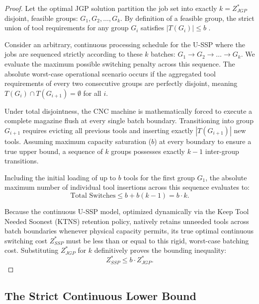 \documentclass[11pt, a4paper]{book}
\begin{document}
	\begin{proof}
		Let the optimal JGP solution partition the job set into exactly $k = Z_{JGP}^*$ disjoint, feasible groups: $G_1, G_2, \dots, G_k$. By definition of a feasible group, the strict union of tool requirements for any group $G_i$ satisfies $|T(G_i)| \le b$ %
		.
		
		Consider an arbitrary, continuous processing schedule for the U-SSP where the jobs are sequenced strictly according to these $k$ batches: $G_1 \to G_2 \to \dots \to G_k$. We evaluate the maximum possible switching penalty across this sequence. The absolute worst-case operational scenario occurs if the aggregated tool requirements of every two consecutive groups are perfectly disjoint, meaning $T(G_i) \cap T(G_{i+1}) = \emptyset$ for all $i$.
		
		Under total disjointness, the CNC machine is mathematically forced to execute a complete magazine flush at every single batch boundary. Transitioning into group $G_{i+1}$ requires evicting all previous tools and inserting exactly $|T(G_{i+1})|$ new tools. Assuming maximum capacity saturation ($b$) at every boundary to ensure a true upper bound, a sequence of $k$ groups possesses exactly $k - 1$ inter-group transitions.
		
		Including the initial loading of up to $b$ tools for the first group $G_1$, the absolute maximum number of individual tool insertions across this sequence evaluates to:
		\begin{equation}
			\text{Total Switches} \le b + b(k - 1) = b \cdot k.
		\end{equation}
		
		Because the continuous U-SSP model, optimized dynamically via the Keep Tool Needed Soonest (KTNS) retention policy, natively retains unneeded tools across batch boundaries whenever physical capacity permits, its true optimal continuous switching cost $Z_{SSP}^*$ must be less than or equal to this rigid, worst-case batching cost. Substituting $Z_{JGP}^*$ for $k$ definitively proves the bounding inequality:
		\begin{equation}
			Z_{SSP}^* \le b \cdot Z_{JGP}^*.
		\end{equation}
	\end{proof}
	
	\subsection{The Strict Continuous Lower Bound}
	
\end{document}
